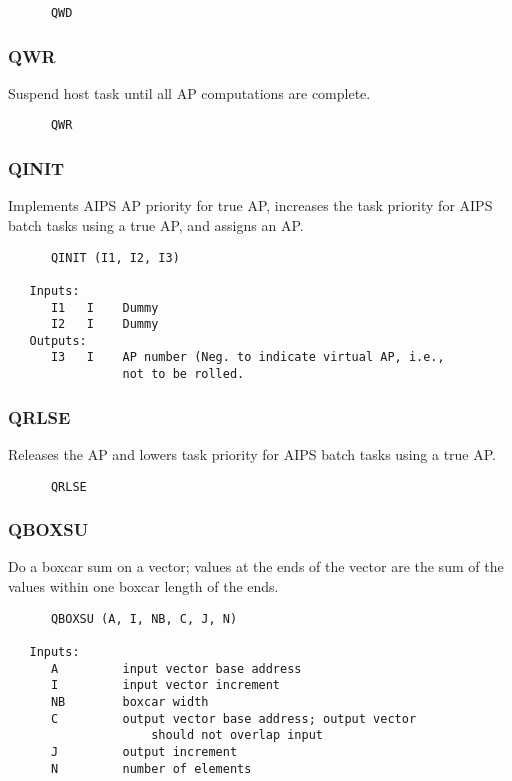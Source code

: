 \begin{verbatim}
      QWD

\end{verbatim}
\subsubsection{QWR }
Suspend host task until all AP computations are complete.

\begin{verbatim}
      QWR

\end{verbatim}
\subsubsection{QINIT }
Implements AIPS AP priority for true AP, increases the task priority
for AIPS batch tasks using a true AP, and assigns an AP.

\begin{verbatim}
      QINIT (I1, I2, I3)

   Inputs:
      I1   I    Dummy
      I2   I    Dummy
   Outputs:
      I3   I    AP number (Neg. to indicate virtual AP, i.e.,
                not to be rolled.

\end{verbatim}
\subsubsection{QRLSE }
Releases the AP and lowers task priority for AIPS batch tasks using a
true AP.

\begin{verbatim}
      QRLSE

\end{verbatim}
\subsubsection{QBOXSU }
Do a boxcar sum on a vector; values at the ends of the vector are the
sum of the values within one boxcar length of the ends.

\begin{verbatim}
      QBOXSU (A, I, NB, C, J, N)

   Inputs:
      A         input vector base address
      I         input vector increment
      NB        boxcar width
      C         output vector base address; output vector
                    should not overlap input
      J         output increment
      N         number of elements

\end{verbatim}
